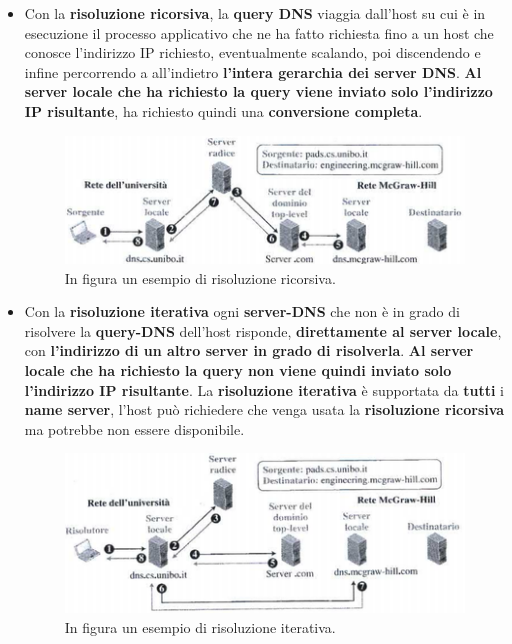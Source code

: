 \documentclass[11pt,a4paper]{article}
\theoremstyle{definition}
\begin{document}
\begin{itemize}
	\item Con la \textbf{risoluzione ricorsiva}, la \textbf{query DNS} viaggia dall'host su cui è in esecuzione il processo applicativo che ne ha fatto richiesta fino a un host che conosce l'indirizzo IP richiesto, eventualmente scalando, poi discendendo e infine percorrendo a all'indietro \textbf{l'intera gerarchia dei server DNS}. \textbf{Al server locale che ha richiesto la query viene inviato \textbf{solo} l'indirizzo IP risultante}, ha richiesto quindi una \textbf{conversione completa}.
	      \begin{figure}[!h]
		      \includegraphics[scale=0.7]{Immagini/DNSrec.png}
		      \centering
		      \caption{In figura un esempio di risoluzione ricorsiva.}
	      \end{figure}
	\item Con la  \textbf{risoluzione iterativa} ogni \textbf{server-DNS} che non è in grado di risolvere la \textbf{query-DNS} dell'host risponde, \textbf{direttamente al server locale}, con \textbf{l'indirizzo di un altro server in grado di risolverla}.
	      \textbf{	Al server locale che ha richiesto la query non viene quindi inviato solo l'indirizzo IP risultante}. La \textbf{risoluzione iterativa} è supportata da \textbf{tutti} i \textbf{name server}, l'host può richiedere che venga usata la \textbf{risoluzione ricorsiva} ma potrebbe non essere disponibile.

	      \begin{figure}[!h]
		      \includegraphics[scale=0.7]{Immagini/DNSite.png}
		      \centering
		      \caption{In figura un esempio di risoluzione iterativa.}
	      \end{figure}
\end{itemize}
\end{document}

